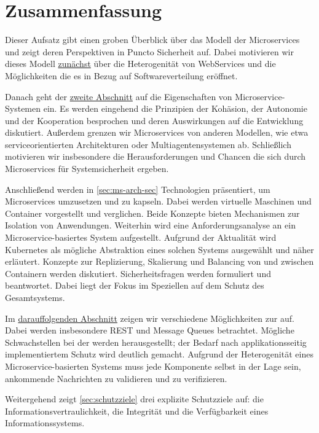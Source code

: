 \section{Zusammenfassung}
\label{sec:zsmfassung}

Dieser Aufsatz gibt einen groben Überblick über das Modell der Microservices und zeigt deren Perspektiven in Puncto Sicherheit auf. Dabei motivieren wir dieses Modell \hyperref[sec:einleitung]{zunächst} über die Heterogenität von WebServices und die Möglichkeiten die es in Bezug auf Softwareverteilung eröffnet.

Danach geht der \hyperref[sec:einführung]{zweite Abschnitt} auf die Eigenschaften von Microservice-Systemen ein. Es werden eingehend die Prinzipien der Kohäsion, der Autonomie und der Kooperation besprochen und deren Auswirkungen auf die Entwicklung diskutiert. Außerdem grenzen wir Microservices von anderen Modellen, wie etwa serviceorientierten Architekturen oder Multiagentensystemen ab. Schließlich motivieren wir insbesondere die Herausforderungen und Chancen die sich durch Microservices für Systemsicherheit ergeben.

Anschließend werden in \autoref{sec:ms-arch-sec} Technologien präsentiert, um Microservices umzusetzen und zu kapseln. Dabei werden virtuelle Maschinen und Container vorgestellt und verglichen. Beide Konzepte bieten Mechanismen zur Isolation von Anwendungen. Weiterhin wird eine Anforderungsanalyse an ein Microservice-basiertes System aufgestellt. Aufgrund der Aktualität wird Kubernetes als mögliche Abstraktion eines solchen Systems ausgewählt und näher erläutert. Konzepte zur Replizierung, Skalierung und Balancing von und zwischen Containern werden diskutiert. Sicherheitsfragen werden formuliert und beantwortet. Dabei liegt der Fokus im Speziellen auf dem Schutz des Gesamtsystems.

Im \hyperref[sec:kommunikation]{darauffolgenden Abschnitt} zeigen wir verschiedene Möglichkeiten zur \stscom auf. Dabei werden insbesondere REST und Message Queues betrachtet. Mögliche Schwachstellen bei der \stscom werden herausgestellt; der Bedarf nach applikationsseitig implementiertem Schutz wird deutlich gemacht. Aufgrund der Heterogenität eines Microservice-basierten Systems muss jede Komponente selbst in der Lage sein, ankommende Nachrichten zu validieren und zu verifizieren.

Weitergehend zeigt \autoref{sec:schutzziele} drei explizite Schutzziele auf: die Informationsvertraulichkeit, die Integrität und die Verfügbarkeit eines Informationssystems. 